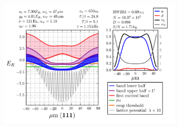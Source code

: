 \documentclass[11pt,letter]{article}
\begin{document}
\begin{itemize}
\begin{figure}[H]
\begin{subfigure}[t]{0.42\textwidth}
		\includegraphics[width=\textwidth]{figures_hubbard-lda/001.png}
\caption{ }
                \label{fig:profiles001}
        \end{subfigure}
	\caption{}
\end{figure}


\end{itemize}
\end{document}
